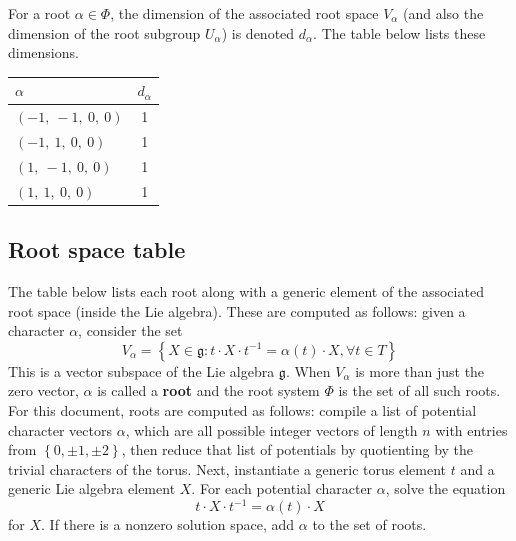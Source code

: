 \documentclass[11pt]{article}
\newcommand{\noi}{\noindent}
\newcommand{\tbf}{\textbf}
\newcommand{\inv}{^{-1}}
\newcommand{\lb}{\left\{}
\newcommand{\rb}{\right\}}
\newcommand{\frakg}{\mathfrak{g}}
\theoremstyle{definition}
\begin{document}
For a root $\alpha \in \Phi$, the dimension of the associated root space $V_\alpha$ (and also the dimension of the root subgroup $U_\alpha$) is denoted $d_\alpha$. The table below lists these dimensions.

\bigskip

\noindent \begin{tabular}{|l|c|}
    \hline
    \textbf{$\alpha$} & \textbf{$d_{\alpha}$} \\
    \hline
    $\left( -1, \  -1, \  0, \  0\right)$ & 1 \\
    \hline
    $\left( -1, \  1, \  0, \  0\right)$ & 1 \\
    \hline
    $\left( 1, \  -1, \  0, \  0\right)$ & 1 \\
    \hline
    $\left( 1, \  1, \  0, \  0\right)$ & 1 \\
    \hline
\end{tabular}


\subsection{Root space table}

\noi The table below lists each root along with a generic element of the associated root space (inside the Lie algebra). These are computed as follows: given a character $\alpha$, consider the set
\[
	V_\alpha = \lb X \in \frakg : t \cdot X \cdot t \inv = \alpha(t) \cdot X, \forall t \in T \rb
\]
This is a vector subspace of the Lie algebra $\frakg$. When $V_\alpha$ is more than just the zero vector, $\alpha$ is called a \tbf{root} and the root system $\Phi$ is the set of all such roots. For this document, roots are computed as follows: compile a list of potential character vectors $\alpha$, which are all possible integer vectors of length $n$ with entries from $\lb 0, \pm 1, \pm 2 \rb$, then reduce that list of potentials by quotienting by the trivial characters of the torus. Next, instantiate a generic torus element $t$ and a generic Lie algebra element $X$. For each potential character $\alpha$, solve the equation
\[
	t \cdot X \cdot t \inv = \alpha(t) \cdot X
\]
for $X$. If there is a nonzero solution space, add $\alpha$ to the set of roots.

\bigskip
\end{document}
